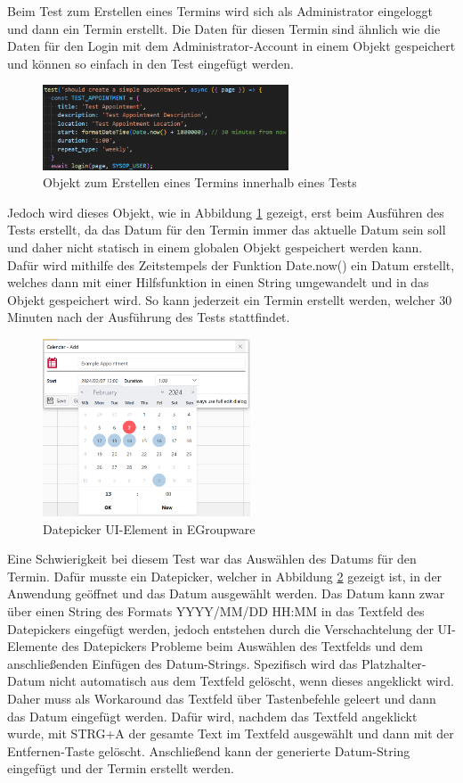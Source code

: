 Beim Test zum Erstellen eines Termins wird sich als Administrator eingeloggt und dann ein Termin erstellt.
Die Daten für diesen Termin sind ähnlich wie die Daten für den Login mit dem Administrator-Account in einem Objekt gespeichert und können so einfach in den Test eingefügt werden.
\begin{figure}[H]
    \centering
    \includegraphics[width=0.65\textwidth]{images/AppointmentObject.png}
    \caption{Objekt zum Erstellen eines Termins innerhalb eines Tests}
    \label{fig:appointment-object}
\end{figure}
Jedoch wird dieses Objekt, wie in Abbildung \ref{fig:appointment-object} gezeigt, erst beim Ausführen des Tests erstellt, da das Datum für den Termin immer das aktuelle Datum sein soll und daher nicht statisch in einem globalen Objekt gespeichert werden kann.
Dafür wird mithilfe des Zeitstempels der Funktion Date.now() ein Datum erstellt, welches dann mit einer Hilfsfunktion in einen String umgewandelt und in das Objekt gespeichert wird.
So kann jederzeit ein Termin erstellt werden, welcher 30 Minuten nach der Ausführung des Tests stattfindet.
\begin{figure}[H]
    \centering
    \includegraphics[width=0.55\textwidth]{images/Datepicker.png}
    \caption{Datepicker UI-Element in EGroupware}
    \label{fig:datepicker}
\end{figure}
Eine Schwierigkeit bei diesem Test war das Auswählen des Datums für den Termin.
Dafür musste ein Datepicker, welcher in Abbildung \ref{fig:datepicker} gezeigt ist, in der Anwendung geöffnet und das Datum ausgewählt werden.
Das Datum kann zwar über einen String des Formats YYYY/MM/DD HH:MM in das Textfeld des Datepickers eingefügt werden, jedoch entstehen durch die Verschachtelung der UI-Elemente des Datepickers Probleme beim Auswählen des Textfelds und dem anschließenden Einfügen des Datum-Strings.
Spezifisch wird das Platzhalter-Datum nicht automatisch aus dem Textfeld gelöscht, wenn dieses angeklickt wird.
Daher muss als Workaround das Textfeld über Tastenbefehle geleert und dann das Datum eingefügt werden.
Dafür wird, nachdem das Textfeld angeklickt wurde, mit STRG+A der gesamte Text im Textfeld ausgewählt und dann mit der Entfernen-Taste gelöscht.
Anschließend kann der generierte Datum-String eingefügt und der Termin erstellt werden.

